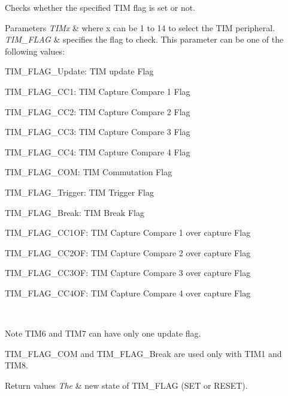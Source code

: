 Checks whether the specified T\+IM flag is set or not. 


\begin{DoxyParams}{Parameters}
{\em T\+I\+Mx} & where x can be 1 to 14 to select the T\+IM peripheral. \\
\hline
{\em T\+I\+M\+\_\+\+F\+L\+AG} & specifies the flag to check. This parameter can be one of the following values\+: \begin{DoxyItemize}
\item T\+I\+M\+\_\+\+F\+L\+A\+G\+\_\+\+Update\+: T\+IM update Flag \item T\+I\+M\+\_\+\+F\+L\+A\+G\+\_\+\+C\+C1\+: T\+IM Capture Compare 1 Flag \item T\+I\+M\+\_\+\+F\+L\+A\+G\+\_\+\+C\+C2\+: T\+IM Capture Compare 2 Flag \item T\+I\+M\+\_\+\+F\+L\+A\+G\+\_\+\+C\+C3\+: T\+IM Capture Compare 3 Flag \item T\+I\+M\+\_\+\+F\+L\+A\+G\+\_\+\+C\+C4\+: T\+IM Capture Compare 4 Flag \item T\+I\+M\+\_\+\+F\+L\+A\+G\+\_\+\+C\+OM\+: T\+IM Commutation Flag \item T\+I\+M\+\_\+\+F\+L\+A\+G\+\_\+\+Trigger\+: T\+IM Trigger Flag \item T\+I\+M\+\_\+\+F\+L\+A\+G\+\_\+\+Break\+: T\+IM Break Flag \item T\+I\+M\+\_\+\+F\+L\+A\+G\+\_\+\+C\+C1\+OF\+: T\+IM Capture Compare 1 over capture Flag \item T\+I\+M\+\_\+\+F\+L\+A\+G\+\_\+\+C\+C2\+OF\+: T\+IM Capture Compare 2 over capture Flag \item T\+I\+M\+\_\+\+F\+L\+A\+G\+\_\+\+C\+C3\+OF\+: T\+IM Capture Compare 3 over capture Flag \item T\+I\+M\+\_\+\+F\+L\+A\+G\+\_\+\+C\+C4\+OF\+: T\+IM Capture Compare 4 over capture Flag\end{DoxyItemize}
\\
\hline
\end{DoxyParams}
\begin{DoxyNote}{Note}
T\+I\+M6 and T\+I\+M7 can have only one update flag. 

T\+I\+M\+\_\+\+F\+L\+A\+G\+\_\+\+C\+OM and T\+I\+M\+\_\+\+F\+L\+A\+G\+\_\+\+Break are used only with T\+I\+M1 and T\+I\+M8.
\end{DoxyNote}

\begin{DoxyRetVals}{Return values}
{\em The} & new state of T\+I\+M\+\_\+\+F\+L\+AG (S\+ET or R\+E\+S\+ET). \\
\hline
\end{DoxyRetVals}


